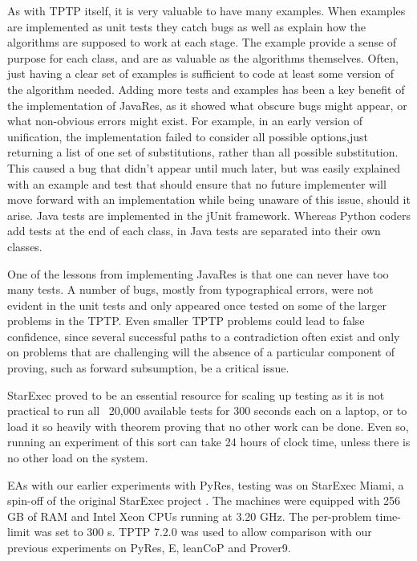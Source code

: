 \documentclass{llncs}
\begin{document}
As with TPTP itself, it is very valuable to have many examples.  When examples are implemented as
unit tests they catch bugs as well as explain how the algorithms are supposed to work at each stage.
The example provide a sense of purpose for each class, and are as valuable as the algorithms
themselves.  Often, just having a clear set of examples is sufficient to code at least some version
of the algorithm needed.  Adding more tests and examples has been a key benefit of the implementation
of JavaRes, as it showed what obscure bugs might appear, or what non-obvious errors might exist.
For example, in an early version of unification, the implementation failed to consider all possible
options,just returning a list of one set of substitutions, rather than all possible substitution.
This caused a bug that didn't appear until much later, but was easily explained with an example and
test that should ensure that no future implementer will move forward with an implementation while
being unaware of this issue, should it arise.  Java tests are implemented in the jUnit framework.
Whereas Python coders add tests at the end of each class, in Java tests  are separated into their
own classes.

One of the lessons from implementing JavaRes is that one can never have too many tests.  A number
of bugs, mostly from typographical errors, were not evident in the unit tests and only appeared
once tested on some of the larger problems in the TPTP.  Even smaller TPTP problems could lead to
false confidence, since several successful paths to a contradiction often exist and only on
problems that are challenging will the absence of a particular component of proving, such as
forward subsumption, be a critical issue.

StarExec proved to be an essential resource for scaling up testing as it is not practical to run
all ~20,000 available tests for 300 seconds each on a laptop, or to load it so heavily with
theorem proving that no other work can be done.  Even so, running an experiment of this sort can
take 24 hours of clock time, unless there is no other load on the system.

EAs with our earlier experiments with PyRes, testing was on StarExec Miami, a spin-off of the
original StarExec project \cite{SST:IJCAR-2014}.
The machines were equipped with 256 GB of RAM and Intel Xeon CPUs running at 3.20 GHz.
The per-problem time-limit was set to 300 s. TPTP 7.2.0 was used to allow comparison with our
previous experiments on PyRes, E, leanCoP and Prover9.
\end{document}
